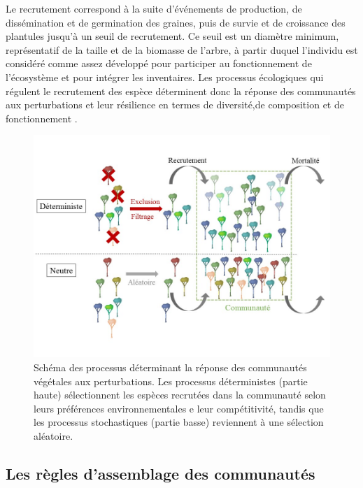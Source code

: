 \documentclass[
  11pt,
  french,
  A4paper,
  extrafontsizes,onecolumn,openright
  ]{memoir}
\begin{document}
Le recrutement correspond à la suite d'événements de production, de
dissémination et de germination des graines, puis de survie et de
croissance des plantules jusqu'à un seuil de recrutement. Ce seuil est
un diamètre minimum, représentatif de la taille et de la biomasse de
l'arbre, à partir duquel l'individu est considéré comme assez développé
pour participer au fonctionnement de l'écosystème et pour intégrer les
inventaires. Les processus écologiques qui régulent le recrutement des
espèce déterminent donc la réponse des communautés aux perturbations et
leur résilience en termes de diversité,de composition et de
fonctionnement \autocites{Denslow1980}{Schnitzer2001}{Asner2004}.

\begin{figure}

{\centering \includegraphics[width=1\linewidth]{ExternalFig/Fig_AssemblyRules} 

}

\caption{Schéma des processus déterminant la réponse des communautés végétales aux perturbations. Les processus déterministes (partie haute) sélectionnent les espèces recrutées dans la communauté selon leurs préférences environnementales e leur compétitivité, tandis que les processus stochastiques (partie basse) reviennent à une sélection aléatoire.}\label{fig:AssemblyRules}
\end{figure}

\subsection{Les règles d'assemblage des
communautés}\label{les-regles-dassemblage-des-communautes}
\end{document}
